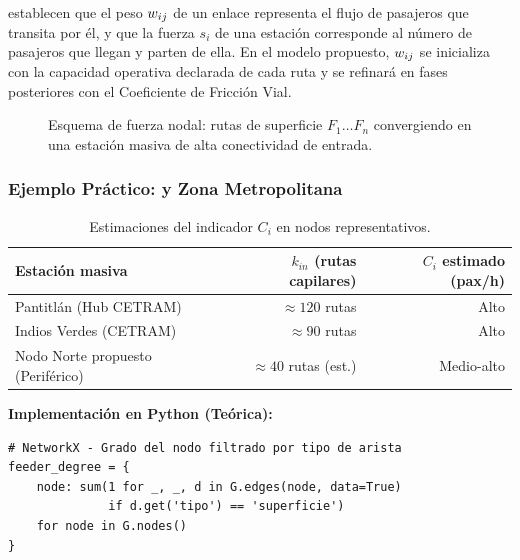  
\textcite{lee2008} establecen que el peso $w_{ij}$ de un enlace representa el
flujo de pasajeros que transita por él, y que la fuerza $s_i$ de una estación
corresponde al número de pasajeros que llegan y parten de ella. En el modelo
propuesto, $w_{ij}$ se inicializa con la capacidad operativa declarada de cada
ruta y se refinará en fases posteriores con el Coeficiente de Fricción Vial.

\begin{figure}[H]
    \centering
    \caption[Diagrama del indicador de Alimentación Capilar $C_i$]{Esquema de
    fuerza nodal: rutas de superficie $F_1 \ldots F_n$ convergiendo en una
    estación masiva de alta conectividad de entrada.}
    \label{fig:indicador-Ci}
 \end{figure}


\subsubsection{Ejemplo Práctico: \cdmx{} y Zona Metropolitana}

\begin{table}[H]
    \centering
    \caption{Estimaciones del indicador $C_i$ en nodos representativos.}
    \label{tab:capilar-nodos}
    \begin{tabularx}{\textwidth}{X r r}
        \toprule
        \textbf{Estación masiva} &
        \textbf{$k_{in}$ (rutas capilares)} &
        \textbf{$C_i$ estimado (pax/h)} \\
        \midrule
        Pantitlán (Hub CETRAM)          & $\approx 120$ rutas & Alto \\
        Indios Verdes (CETRAM)          & $\approx 90$ rutas  & Alto \\
        Nodo Norte propuesto (Periférico) & $\approx 40$ rutas (est.) & Medio-alto \\
        \bottomrule
    \end{tabularx}
\end{table}

\textbf{Implementación en Python (Teórica):}

\begin{lstlisting}[style=estiloPython, caption={Cálculo de grado capilar por nodo con NetworkX.}, label={lst:fuerza-nodal}]
# NetworkX - Grado del nodo filtrado por tipo de arista
feeder_degree = {
    node: sum(1 for _, _, d in G.edges(node, data=True)
              if d.get('tipo') == 'superficie')
    for node in G.nodes()
}
\end{lstlisting}


